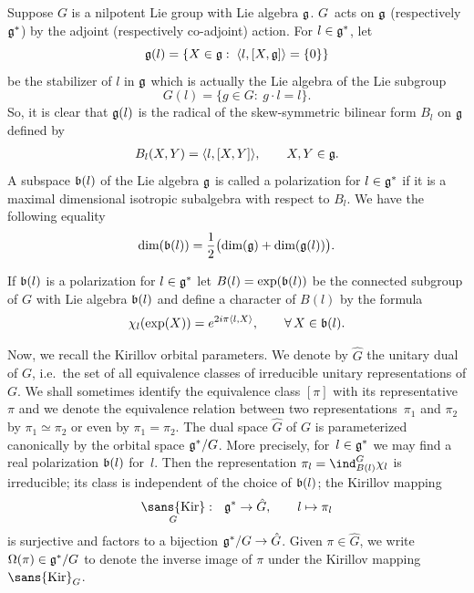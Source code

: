 \documentclass[pdftex]{sigma}
\DeclareMathOperator{\kir}{\sans{Kir}}
\def\hb#1{\hbox{#1}}
\def\hb #1{\hbox{#1}}
\def\hb#1{\hbox{#1}}
\def\dim#1{\hb{dim}(#1)}
\begin{document}
Suppose $G$ is a nilpotent Lie group with Lie algebra $\frak g$. $G$~acts on $\frak g$ (respectively $\frak g^*$) by the adjoint
(respectively co-adjoint) action. For $l\in \frak g^*$, let
\[
\frak
g(l) = \{X\in \frak g:\; \langle l, [X, \frak g]\rangle = \{0\}\}
\]
be the stabilizer of $l$ in $\frak g$ which is actually the Lie
algebra of the Lie subgroup
\[
G(l) = \{g\in G:\ g\cdot l = l\}.
\]
So, it is clear that $\frak g(l)$ is the radical of the
skew-symmetric bilinear form $B_l$ on $\frak g$ def\/ined by
\begin{gather*}%
B_l(X, Y) = \langle l, [X, Y]\rangle,\qquad X, Y \in \frak g.
\end{gather*}
A subspace $\frak b(l)$ of the Lie algebra $\frak g$ is called a
polarization for $l\in \frak g^*$ if it is a maximal dimensional
isotropic subalgebra with respect to $B_l$. We have the following
equality
\begin{gather}\label{dim-pilarisation}
\dim{\frak b(l)}=\dfrac{1}{2} \big(\dim{\frak g}+\dim{\frak
g(l)}\big).
\end{gather}

If $\frak b(l)$ is a polarization for $l\in \frak g^*$ let
$B(l)=\exp(\frak b(l))$ be the connected subgroup of $G$ with Lie
algebra $\frak b(l)$ and def\/ine a character of $B(l)$ by the formula
\begin{gather*}%
\chi_l(\exp(X))= e^{2i \pi \langle l, X\rangle},\qquad \forall\, X\in \frak b(l).
\end{gather*}



Now, we recall the Kirillov orbital parameters. We denote by $\hat
G$ the unitary dual of $G$, i.e.\ the set of all equivalence classes
of irreducible unitary representations of $G$. We shall sometimes
identify the equivalence class $[\pi]$ with its representative $\pi$
and we denote the equivalence relation between two representations~$\pi_1$ and $\pi_2$ by $\pi_1 \simeq \pi_2$ or even by $\pi_1 =
\pi_2$.  The dual space $\hat G$ of $G$ is parameterized canonically
by the orbital space $\frak g^*/G$. More precisely, for~$l \in \frak
g^*$ we may f\/ind a real polarization $\frak b(l)$ for~$l$.
 Then the representation $\pi_l =
\ind_{B(l)}^G \chi_l$ is irreducible; its class is independent of
the choice of $\frak b(l)$; the Kirillov mapping
\begin{gather*}
\kir_G:  \ \ \frak g^* \rightarrow \hat G,\qquad  l \mapsto\pi_l
\end{gather*}
 is surjective and factors to a
bijection $\frak g^*/G \rightarrow \hat G$. Given $\pi \in \hat G$, we write $\Omega(\pi) \in \frak g^*/G$ to denote the inverse
image of $\pi$ under the Kirillov mapping $\kir_G$.
\end{document}
